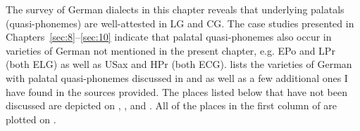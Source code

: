 The survey of German dialects in this chapter reveals that underlying palatals (quasi-phonemes) are well-attested in LG and CG. The case studies presented in Chapters~\ref{sec:8}--\ref{sec:10} indicate that palatal quasi-phonemes also occur in varieties of German not mentioned in the present chapter, e.g. EPo and LPr (both ELG) as well as USax and HPr (both ECG).  lists the varieties of German with palatal quasi-phonemes discussed in   and  as well as a few additional ones I have found in the sources provided. The places listed below that have not been discussed are depicted on , , and . All of the places in the first column of  are plotted on .

